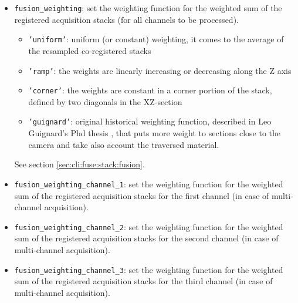 \begin{itemize}
\item \texttt{fusion\_weighting}: 
  set the weighting function for the weighted sum of the registered
  acquisition stacks (for all channels to be processed).
  \begin{itemize}
  \itemsep -0.5ex
  \item \texttt{'uniform'}: uniform (or constant) weighting, it comes 
  to the average of the resampled co-registered stacks
  \item \texttt{'ramp'}: the weights are linearly increasing or 
  decreasing along the Z axis
  \item \texttt{'corner'}: the weights are constant in a corner portion 
  of the stack, defined by two diagonals in the XZ-section
  \item \texttt{'guignard'}: original historical weighting function, 
  described in Leo Guignard's Phd thesis \cite{guignard:tel-01278725}, 
  that puts more weight to sections close to the camera and take
  also account the traversed material.
  \end{itemize}
  See section \ref{sec:cli:fuse:stack:fusion}.
\item \texttt{fusion\_weighting\_channel\_1}:
  set the weighting function for the weighted sum of the registered
  acquisition stacks for the first channel (in case of multi-channel
  acquisition).
\item \texttt{fusion\_weighting\_channel\_2}:
  set the weighting function for the weighted sum of the registered
  acquisition stacks for the second channel (in case of multi-channel
  acquisition).
\item \texttt{fusion\_weighting\_channel\_3}:
  set the weighting function for the weighted sum of the registered
  acquisition stacks for the third channel (in case of multi-channel
  acquisition).
\end{itemize}

